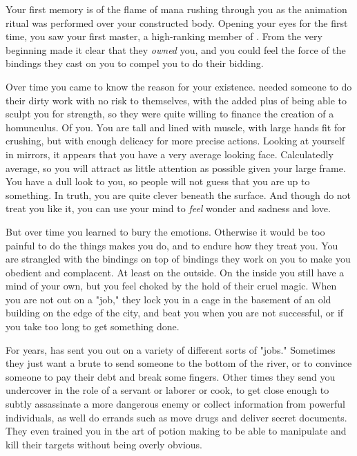 \documentclass[char]{guildcamp3}
\begin{document}
	
	\name{\cServant{}}
	
	
	Your first memory is of the flame of mana rushing through you as the animation ritual was performed over your constructed body. Opening your eyes for the first time, you saw your first master, a high-ranking member of \bMagicMob{}. From the very beginning \bMagicMob{} made it clear that they \emph{owned} you, and you could feel the force of the bindings they cast on you to compel you to do their bidding. 
	
	Over time you came to know the reason for your existence. \bMagicMob{} needed someone to do their dirty work with no risk to themselves, with the added plus of being able to sculpt you for strength, so they were quite willing to finance the creation of a homunculus. Of you. You are tall and lined with muscle, with large hands fit for crushing, but with enough delicacy for more precise actions. Looking at yourself in mirrors, it appears that you have a very average looking face. Calculatedly average, so you will attract as little attention as possible given your large frame. You have a dull look to you, so people will not guess that you are up to something. In truth, you are quite clever beneath the surface. And though \bMagicMob{} do not treat you like it, you can use your mind to \emph{feel} wonder and sadness and love.
	
	But over time you learned to bury the emotions. Otherwise it would be too painful to do the things \bMagicMob{} makes you do, and to endure how they treat you. You are strangled with the bindings on top of bindings they work on you to make you obedient and complacent. At least on the outside. On the inside you still have a mind of your own, but you feel choked by the hold of their cruel magic. When you are not out on a "job," they lock you in a cage in the basement of an old building on the edge of the city, and beat you when you are not successful, or if you take too long to get something done.
	
	For years, \bMagicMob{} has sent you out on a variety of different sorts of "jobs." Sometimes they just want a brute to send someone to the bottom of the river, or to convince someone to pay their debt and break some fingers. Other times they send you undercover in the role of a servant or laborer or cook, to get close enough to subtly assassinate a more dangerous enemy or collect information from powerful individuals, as well do errands such as move drugs and deliver secret documents. They even trained you in the art of potion making to be able to manipulate and kill their targets without being overly obvious.
	
\end{document}
